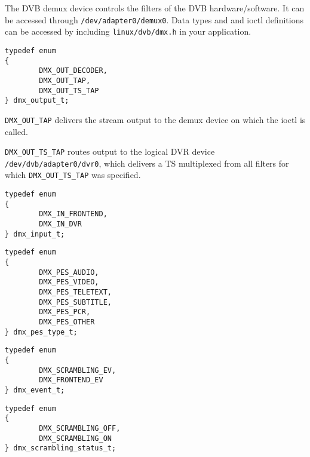 
The DVB demux device controls the filters of the DVB hardware/software.
It can be accessed through \texttt{/dev/adapter0/demux0}.
Data types and and ioctl definitions can be accessed by including
\texttt{linux/dvb/dmx.h} in your application.



\label{dmxoutput}

\begin{verbatim}
typedef enum
{
        DMX_OUT_DECODER,
        DMX_OUT_TAP,
        DMX_OUT_TS_TAP
} dmx_output_t;
\end{verbatim}

\noindent\texttt{DMX\_OUT\_TAP} delivers the stream output to the demux device
on which the ioctl is called.

\noindent\texttt{DMX\_OUT\_TS\_TAP} routes output to the logical DVR device
\texttt{/dev/dvb/adapter0/dvr0}, which delivers a TS multiplexed from
all filters for which \texttt{DMX\_OUT\_TS\_TAP} was specified.


\label{dmxinput}

\begin{verbatim}
typedef enum
{
        DMX_IN_FRONTEND,
        DMX_IN_DVR
} dmx_input_t;
\end{verbatim}


\label{dmxpestype}

\begin{verbatim}
typedef enum
{
        DMX_PES_AUDIO,
        DMX_PES_VIDEO,
        DMX_PES_TELETEXT,
        DMX_PES_SUBTITLE,
        DMX_PES_PCR,
        DMX_PES_OTHER
} dmx_pes_type_t;
\end{verbatim}


\label{dmxeventt}

\begin{verbatim}
typedef enum
{
        DMX_SCRAMBLING_EV,
        DMX_FRONTEND_EV
} dmx_event_t;
\end{verbatim}


\label{dmxscramblingstatus}

\begin{verbatim}
typedef enum
{
        DMX_SCRAMBLING_OFF,
        DMX_SCRAMBLING_ON
} dmx_scrambling_status_t;
\end{verbatim}


\label{dmxfilter}

